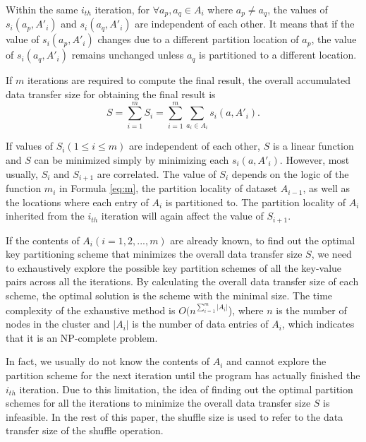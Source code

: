 \documentclass[10pt,journal,compsoc]{IEEEtran}
\begin{document}
Within the same $i_{th}$ iteration, for $\forall a_p, a_q \in A_i$ where $a_p \neq a_q$, the values of $s_i(a_p,A'_i)$ and $s_i(a_q,A'_i)$ are independent of each other. 
It means that if the value of $s_i(a_p,A'_i)$ changes due to a different partition location of $a_p$, the value of $s_i(a_q,A'_i)$ remains unchanged unless $a_q$ is partitioned to a different location. 

If $m$ iterations are required to compute the final result, 
the overall accumulated data transfer size for obtaining the final result is
\begin{equation}\label{eq:s}
S=\sum_{i=1}^{m} S_i=\sum_{i=1}^{m} \sum_{a_i \in A_i} s_i(a,A'_i).
\end{equation}


If values of $S_i (1 \leq i \leq m)$ are independent of each other, 
$S$ is a linear function and $S$ can be minimized simply by minimizing each $s_i(a,A'_i)$.
However, most usually, $S_i$ and $S_{i+1}$ are correlated.
The value of $S_i$ depends on the logic of the function $m_i$ in Formula \ref{eq:m}, 
the partition locality of dataset $ A_{i-1}$, 
as well as the locations where each entry of $A_i$ is partitioned to. 
The partition locality of $A_i$ inherited from the $i_{th}$ iteration 
will again affect the value of $S_{i+1}$.

If the contents of $A_i (i=1,2,...,m)$ are already known, to find out the optimal key partitioning scheme that minimizes 
the overall data transfer size $S$,  %
we need to exhaustively explore the possible key partition schemes of all the key-value pairs across all the iterations. 
By calculating the overall data transfer size of each scheme, the optimal solution is the scheme with the minimal size. 
The time complexity of the exhaustive method is $O(n^{\sum_{i=1}^{m} |A_i|}$), 
where $n$ is the number of nodes in the cluster and $|A_i|$ is the number of data entries of $A_i$, 
which indicates that it is an NP-complete problem. 

In fact, we usually do not know the contents of $A_i$ and cannot explore the partition scheme 
for the next iteration until the program has actually finished the $i_{th}$ iteration. 
Due to this limitation, the idea of finding out the optimal partition schemes for all the iterations to minimize the overall data transfer size $S$ is infeasible. 
In the rest of this paper, the shuffle size is used to refer to the data transfer size of the shuffle operation. 
\end{document}
